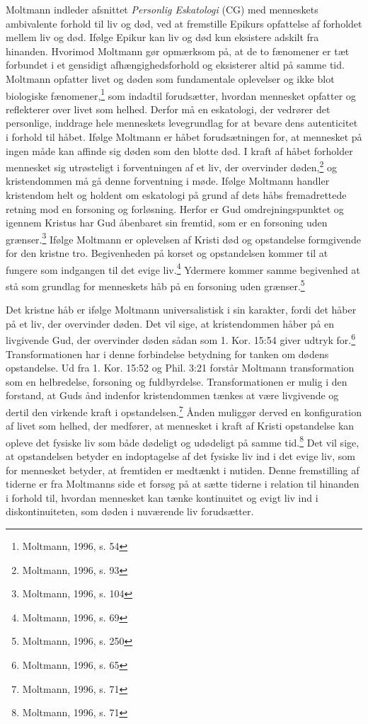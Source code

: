Moltmann indleder afsnittet \textit{Personlig Eskatologi} (CG) med menneskets ambivalente forhold til liv og død, ved at fremstille Epikurs opfattelse af forholdet mellem liv og død. Ifølge Epikur kan liv og død kun eksistere adskilt fra hinanden. Hvorimod Moltmann gør opmærksom på, at de to fænomener er tæt forbundet i et gensidigt afhængighedsforhold og eksisterer altid på samme tid. Moltmann opfatter livet og døden som fundamentale oplevelser og ikke blot biologiske fænomener,\footnote{Moltmann, 1996, s. 54} som indadtil forudsætter, hvordan mennesket opfatter og reflekterer over livet som helhed. Derfor må en eskatologi, der vedrører det personlige, inddrage hele menneskets levegrundlag for at bevare dens autenticitet i forhold til håbet. Ifølge Moltmann er håbet forudsætningen for, at mennesket på ingen måde kan affinde sig døden som den blotte død. I kraft af håbet forholder mennesket sig utrøsteligt i forventningen af et liv, der overvinder døden,\footnote{Moltmann, 1996, s. 93} og kristendommen må gå denne forventning i møde. Ifølge Moltmann handler kristendom helt og holdent om eskatologi på grund af dets håbs fremadrettede retning mod en forsoning og forløsning. Herfor er Gud omdrejningspunktet og igennem Kristus har Gud åbenbaret sin fremtid, som er en forsoning uden grænser.\footnote{Moltmann, 1996, s. 104} Ifølge Moltmann er oplevelsen af Kristi død og opstandelse formgivende for den kristne tro. Begivenheden på korset og opstandelsen kommer til at fungere som indgangen til det evige liv.\footnote{Moltmann, 1996, s. 69} Ydermere kommer samme begivenhed at stå som grundlag for menneskets håb på en forsoning uden grænser.\footnote{Moltmann, 1996, s. 250}

Det kristne håb er ifølge Moltmann universalistisk i sin karakter, fordi det håber på et liv, der overvinder døden. Det vil sige, at kristendommen håber på en livgivende Gud, der overvinder døden sådan som 1. Kor. 15:54 giver udtryk for.\footnote{Moltmann, 1996, s. 65}  Transformationen har i denne forbindelse betydning for tanken om dødens opstandelse. Ud fra 1. Kor. 15:52 og Phil. 3:21 forstår Moltmann transformation som en helbredelse, forsoning og fuldbyrdelse. Transformationen er mulig i den forstand, at Guds ånd indenfor kristendommen tænkes at være livgivende og dertil den virkende kraft i opstandelsen.\footnote{Moltmann, 1996, s. 71} Ånden muliggør derved en konfiguration af livet som helhed, der medfører, at mennesket i kraft af Kristi opstandelse kan opleve det fysiske liv som både dødeligt og udødeligt på samme tid.\footnote{Moltmann, 1996, s. 71} Det vil sige, at opstandelsen betyder en indoptagelse af det fysiske liv ind i det evige liv, som for mennesket betyder, at fremtiden er medtænkt i nutiden. Denne fremstilling af tiderne er fra Moltmanns side et forsøg på at sætte tiderne i relation til hinanden i forhold til, hvordan mennesket kan tænke kontinuitet og evigt liv ind i diskontinuiteten, som døden i nuværende liv forudsætter.

